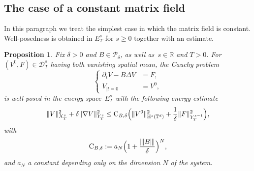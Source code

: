 \documentclass[JEP,XML,SOM,Unicode,published]{cedram}
\newtheorem{prop}{Proposition}[section]
\theoremstyle{definition}
\newcommand\R{\mathbb{R}}
\newcommand\T{\mathbb{T}}
\newcommand\C{\mathrm{C}}
\renewcommand\H{\mathrm{H}}
\newcommand{\vertiii}[1]{{\vert\kern-0.08em\vert\kern-0.08em\vert #1 \vert\kern-0.08em\vert\kern-0.08em\vert}}
\begin{document}
\subsection{The case of a constant matrix field}
In this paragraph we treat the simplest case in which the matrix field is constant. Well-posedness is obtained in $E_T^s$ for $s\geq 0$ together with an estimate.
\begin{prop}\label{prop:systlin}
Fix $\delta>0$ and $B\in\mathscr{P}_\delta$, as well as~$s\in \R$ and $T>0$. For $(V^0,F)\in \mathcal D_T^s$ having both vanishing spatial mean, the Cauchy problem
\[
\left\{
\begin{aligned}
\partial_t V-B \Delta V &= F,\\
V_{|t=0} &= V^0,
\end{aligned}
\right.
\]
is well-posed in the energy space~$E_{T}^s$ with the following energy estimate
\begin{align}
\label{eq:boundlinHs}
\|V\|_{X_{T}^s}^2 + \delta \|\nabla V\|_{Y_{T}^s}^2 \leq \textnormal{C}_{B,\delta} \Bigl(\| V^0\|_{\H^s(\T^d)}^2 + \frac{1}{\delta} \|F\|_{Y_{T}^{s-1}}^2\Bigr),
\end{align}
with
\begin{equation}
\label{eq:CAdelta} \C_{B,\delta}:= a_N \Bigl(1+\frac {\vertiii{B }} \delta\Bigr)^N,
\end{equation}
and $a_N$ a constant depending only on the dimension $N$ of the system.
\end{prop}
\end{document}
